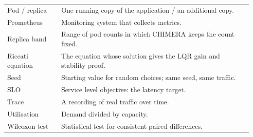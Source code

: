 \documentclass[11pt,a4paper]{article}
\begin{document}
\begin{longtable}{@{}p{3.6cm}p{11.4cm}@{}}
Pod / replica & One running copy of the application / an additional copy. \\
Prometheus & Monitoring system that collects metrics. \\
Replica band & Range of pod counts in which CHIMERA keeps the count fixed. \\
Riccati equation & The equation whose solution gives the LQR gain and stability proof. \\
Seed & Starting value for random choices; same seed, same traffic. \\
SLO & Service level objective: the latency target. \\
Trace & A recording of real traffic over time. \\
Utilisation & Demand divided by capacity. \\
Wilcoxon test & Statistical test for consistent paired differences. \\
\bottomrule
\end{longtable}
\end{document}
